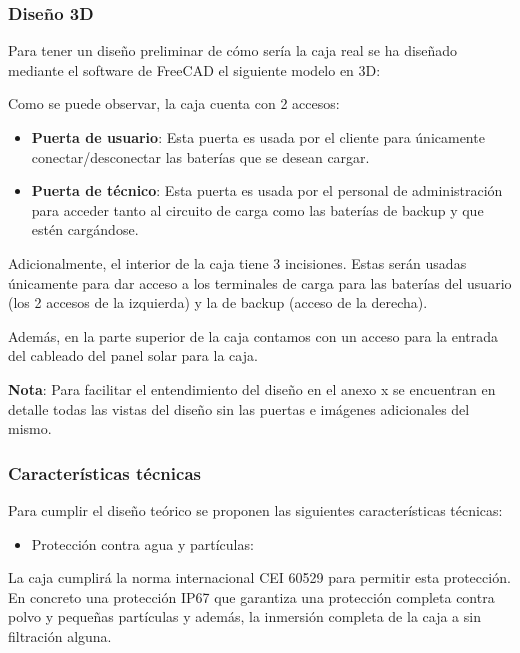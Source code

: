 \documentclass{article}
\begin{document}
\subsubsection{Diseño 3D}

Para tener un diseño preliminar de cómo sería la caja real se ha diseñado mediante el software de FreeCAD el siguiente modelo en 3D:


Como se puede observar, la caja cuenta con 2 accesos:
\begin{itemize}
    \item \textbf{Puerta de usuario}: Esta puerta es usada por el cliente para únicamente conectar/desconectar las baterías que se desean cargar.
    \item \textbf{Puerta de técnico}: Esta puerta es usada por el personal de administración para acceder tanto al circuito de carga como las baterías de backup y que estén cargándose.
\end{itemize}

Adicionalmente, el interior de la caja tiene 3 incisiones. Estas serán usadas únicamente para dar acceso a los terminales de carga para las baterías del usuario (los 2 accesos de la izquierda) y la de backup (acceso de la derecha).

Además, en la parte superior de la caja contamos con un acceso para la entrada del cableado del panel solar para la caja.

\textbf{Nota}: Para facilitar el entendimiento del diseño en el anexo x se encuentran en detalle todas las vistas del diseño sin las puertas e imágenes adicionales del mismo.

\subsubsection{Características técnicas}

Para cumplir el diseño teórico se proponen las siguientes características técnicas:
\begin{itemize}
    \item Protección contra agua y partículas:
\end{itemize}

La caja cumplirá la norma internacional CEI 60529 para permitir esta protección. En concreto una protección IP67 que garantiza una protección completa contra polvo y pequeñas partículas y además, la inmersión completa de la caja a sin filtración alguna. 
\end{document}
